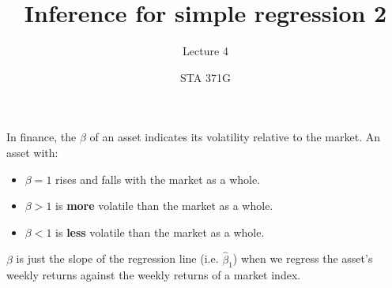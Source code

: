 \documentclass{beamer}\usepackage[]{graphicx}\usepackage[]{color}
\title{Inference for simple regression 2}
\subtitle{Lecture 4}
\author{STA 371G}
\makeatletter
\newcommand{\hlstr}[1]{\textcolor[rgb]{1,0.894,0.71}{#1}}%
\newcommand{\hlopt}[1]{\textcolor[rgb]{1,0.894,0.769}{#1}}%
\newcommand{\hlstd}[1]{\textcolor[rgb]{1,0.894,0.769}{#1}}%
\newcommand{\hlkwc}[1]{\textcolor[rgb]{0.78,0.941,0.545}{#1}}%
\newcommand{\hlkwd}[1]{\textcolor[rgb]{1,0.78,0.769}{#1}}%
\newenvironment{kframe}{%
 \def\at@end@of@kframe{}%
 \ifinner\ifhmode%
  \def\at@end@of@kframe{\end{minipage}}%
  \begin{minipage}{\columnwidth}%
 \fi\fi%
 \def\FrameCommand##1{\hskip\@totalleftmargin \hskip-\fboxsep
 \colorbox{shadecolor}{##1}\hskip-\fboxsep
     \hskip-\linewidth \hskip-\@totalleftmargin \hskip\columnwidth}%
 \MakeFramed {\advance\hsize-\width
   \@totalleftmargin\z@ \linewidth\hsize
   \@setminipage}}%
 {\par\unskip\endMakeFramed%
 \at@end@of@kframe}
\newenvironment{knitrout}{}{} %
\makeatother
\begin{document}
  
  
  

  \frame{\maketitle}



  \begin{darkframes}
    \begin{frame}
      In finance, the $\beta$ of an asset indicates its volatility relative to the market. An asset with:
      \pause
      \begin{itemize}[<+->]
        \item $\beta=1$ rises and falls with the market as a whole.
        \item $\beta>1$ is \textbf{more} volatile than the market as a whole.
        \item $\beta<1$ is \textbf{less} volatile than the market as a whole.
      \end{itemize}
      \pause
      $\beta$ is just the slope of the regression line (i.e. $\hat\beta_1$) when we regress the asset's weekly returns against the weekly returns of a market index.
    \end{frame}



\end{darkframes}
\end{document}

